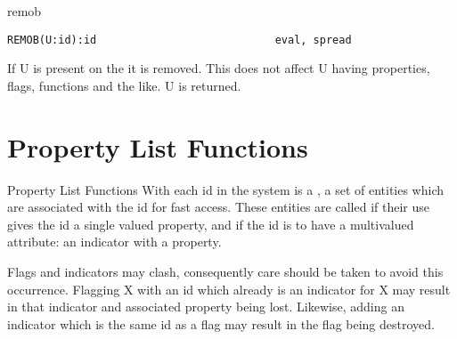 \begin{Function}{remob}
\begin{verbatim}
REMOB(U:id):id                            eval, spread
\end{verbatim}
   If  U is present on the   it is removed.   This does not
   affect  U having properties, flags, functions and the like.  U
   is returned.

\end{Function}

\section{Property List Functions}
\begin{Introduction}{Property List Functions}
With each id in the system is a , a set of entities
which are associated with the id for fast access. These entities are
called  if their use gives the id a single valued
property, and  if the id is to have a multivalued
attribute: an indicator with a property.

Flags and indicators may clash, consequently care should be taken to
avoid this occurrence. Flagging X with an id which already is an
indicator for X may result in that indicator and associated property
being lost. Likewise, adding an indicator which is the same id as a
flag may result in the flag being destroyed.
\end{Introduction}



